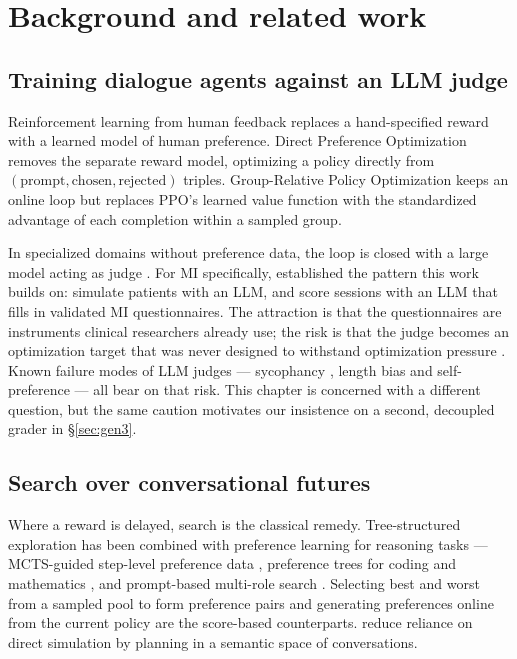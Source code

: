 \section{Background and related work}
\label{sec:background}

\subsection{Training dialogue agents against an LLM judge}
Reinforcement learning from human feedback \citep{christiano2017deeprl, ouyang2022instructgpt}
replaces a hand-specified reward with a learned model of human preference. Direct Preference
Optimization \citep[DPO;][]{rafailov2023dpo} removes the separate reward model, optimizing a
policy directly from $(\text{prompt}, \text{chosen}, \text{rejected})$ triples. Group-Relative
Policy Optimization \citep[GRPO;][]{shao2024deepseekmath} keeps an online loop but replaces
PPO's learned value function \citep{schulman2017ppo} with the standardized advantage of each
completion within a sampled group.

In specialized domains without preference data, the loop is closed with a large model acting
as judge \citep{zheng2023judging}. For MI specifically, \citet{yosef2024assessing} established
the pattern this work builds on: simulate patients with an LLM, and score sessions with an LLM
that fills in validated MI questionnaires. The attraction is that the questionnaires are
instruments clinical researchers already use; the risk is that the judge becomes an
optimization target that was never designed to withstand optimization pressure
\citep{gao2023scaling, skalse2022defining}. Known failure modes of LLM judges --- sycophancy
\citep{sharma2024sycophancy, perez2023discovering}, length bias
\citep{dubois2024lengthcontrolled} and self-preference \citep{panickssery2024selfpreference}
--- all bear on that risk. This chapter is concerned with a different question, but the same
caution motivates our insistence on a second, decoupled grader in \S\ref{sec:gen3}.

\subsection{Search over conversational futures}
Where a reward is delayed, search is the classical remedy. Tree-structured exploration has been
combined with preference learning for reasoning tasks --- MCTS-guided step-level preference data
\citep{xie2024mctsdpo}, preference trees for coding and mathematics \citep{yuan2024eurus}, and
prompt-based multi-role search \citep{yu2023promptmcts}. Selecting best and worst from a sampled
pool to form preference pairs \citep{pace2024westofn} and generating preferences online from the
current policy \citep{guo2024oaif, yuan2024selfrewarding} are the score-based counterparts.
\citet{chen2025broaden} reduce reliance on direct simulation by planning in a semantic space of
conversations.

